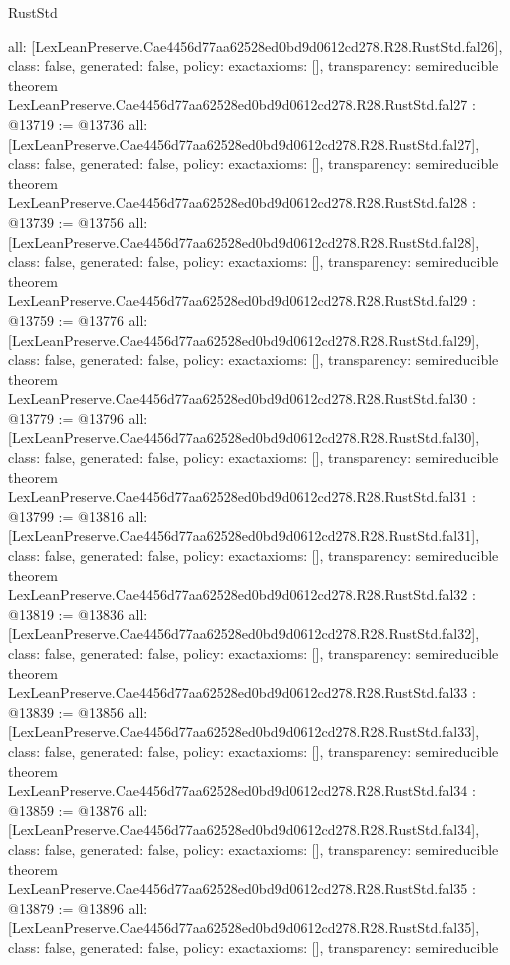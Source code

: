 \begin{lexlean}{RustStd}
\begin{coremodule}
{  all: [LexLeanPreserve.Cae4456d77aa62528ed0bd9d0612cd278.R28.RustStd.fal26],
  class: false,
  generated: false,
  policy: exact{axioms: []},
  transparency: semireducible
}
theorem LexLeanPreserve.Cae4456d77aa62528ed0bd9d0612cd278.R28.RustStd.fal27 : @13719 := @13736 {
  all: [LexLeanPreserve.Cae4456d77aa62528ed0bd9d0612cd278.R28.RustStd.fal27],
  class: false,
  generated: false,
  policy: exact{axioms: []},
  transparency: semireducible
}
theorem LexLeanPreserve.Cae4456d77aa62528ed0bd9d0612cd278.R28.RustStd.fal28 : @13739 := @13756 {
  all: [LexLeanPreserve.Cae4456d77aa62528ed0bd9d0612cd278.R28.RustStd.fal28],
  class: false,
  generated: false,
  policy: exact{axioms: []},
  transparency: semireducible
}
theorem LexLeanPreserve.Cae4456d77aa62528ed0bd9d0612cd278.R28.RustStd.fal29 : @13759 := @13776 {
  all: [LexLeanPreserve.Cae4456d77aa62528ed0bd9d0612cd278.R28.RustStd.fal29],
  class: false,
  generated: false,
  policy: exact{axioms: []},
  transparency: semireducible
}
theorem LexLeanPreserve.Cae4456d77aa62528ed0bd9d0612cd278.R28.RustStd.fal30 : @13779 := @13796 {
  all: [LexLeanPreserve.Cae4456d77aa62528ed0bd9d0612cd278.R28.RustStd.fal30],
  class: false,
  generated: false,
  policy: exact{axioms: []},
  transparency: semireducible
}
theorem LexLeanPreserve.Cae4456d77aa62528ed0bd9d0612cd278.R28.RustStd.fal31 : @13799 := @13816 {
  all: [LexLeanPreserve.Cae4456d77aa62528ed0bd9d0612cd278.R28.RustStd.fal31],
  class: false,
  generated: false,
  policy: exact{axioms: []},
  transparency: semireducible
}
theorem LexLeanPreserve.Cae4456d77aa62528ed0bd9d0612cd278.R28.RustStd.fal32 : @13819 := @13836 {
  all: [LexLeanPreserve.Cae4456d77aa62528ed0bd9d0612cd278.R28.RustStd.fal32],
  class: false,
  generated: false,
  policy: exact{axioms: []},
  transparency: semireducible
}
theorem LexLeanPreserve.Cae4456d77aa62528ed0bd9d0612cd278.R28.RustStd.fal33 : @13839 := @13856 {
  all: [LexLeanPreserve.Cae4456d77aa62528ed0bd9d0612cd278.R28.RustStd.fal33],
  class: false,
  generated: false,
  policy: exact{axioms: []},
  transparency: semireducible
}
theorem LexLeanPreserve.Cae4456d77aa62528ed0bd9d0612cd278.R28.RustStd.fal34 : @13859 := @13876 {
  all: [LexLeanPreserve.Cae4456d77aa62528ed0bd9d0612cd278.R28.RustStd.fal34],
  class: false,
  generated: false,
  policy: exact{axioms: []},
  transparency: semireducible
}
theorem LexLeanPreserve.Cae4456d77aa62528ed0bd9d0612cd278.R28.RustStd.fal35 : @13879 := @13896 {
  all: [LexLeanPreserve.Cae4456d77aa62528ed0bd9d0612cd278.R28.RustStd.fal35],
  class: false,
  generated: false,
  policy: exact{axioms: []},
  transparency: semireducible
}
\end{coremodule}
\end{lexlean}
